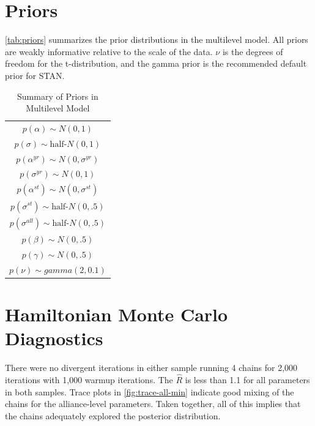 \documentclass[12pt]{article}
\begin{document}
 


\section{Priors}

\autoref{tab:priors} summarizes the prior distributions in the multilevel model. 
All priors are weakly informative relative to the scale of the data. 
$\nu$ is the degrees of freedom for the t-distribution, and the gamma prior is the recommended default prior for STAN. 

\begin{table} %
\begin{center}
\begin{tabular}{c} 
$ p(\alpha) \sim N(0, 1)$  \\
$ p(\sigma) \sim \mbox{half-}N(0, 1) $ \\
$ p(\alpha^{yr}) \sim N(0, \sigma^{yr}) $ \\ 
$ p(\sigma^{yr}) \sim N(0, 1) $ \\
$ p(\alpha^{st}) \sim N(0, \sigma^{st}) $ \\ 
$ p(\sigma^{st}) \sim \mbox{half-}N(0, .5) $ \\ 
$ p(\sigma^{all}) \sim \mbox{half-}N(0, .5) $ \\
$ p(\beta) \sim N(0, .5) $ \\
$ p(\gamma) \sim N(0, .5) $ \\ 
$ p(\nu) \sim gamma(2, 0.1)$ 
\end{tabular} 
\caption{Summary of Priors in Multilevel Model} 
\label{tab:priors}
\end{center} 
\end{table} 


\section{Hamiltonian Monte Carlo Diagnostics}

There were no divergent iterations in either sample running 4 chains for 2,000 iterations with 1,000 warmup iterations. 
The $\hat{R}$ is less than 1.1 for all parameters in both samples. 
Trace plots in \autoref{fig:trace-all-min} indicate good mixing of the chains for the alliance-level parameters. 
Taken together, all of this implies that the chains adequately explored the posterior distribution. 
\end{document}
